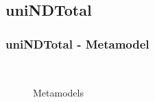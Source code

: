 \documentclass{beamer}
\begin{document}

\subsection{uniNDTotal}

\begin{frame}
\frametitle{\textbf{uniNDTotal} - \textbf{Metamodel}}

\begin{figure}[ht]
    \centering
    \mbox{\qquad\qquad
          }
    \caption{Metamodels}
    \label{fig:Meta}
\end{figure}

\end{frame}
\end{document}
